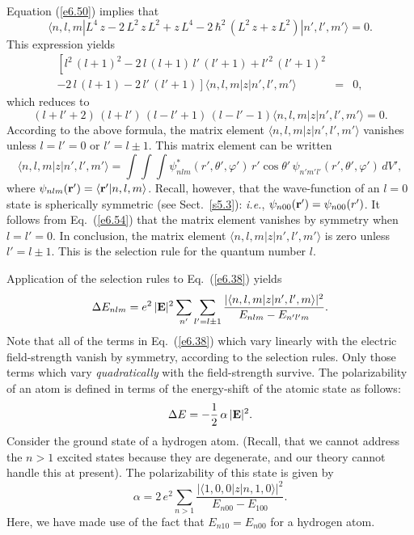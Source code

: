 Equation (\ref{e6.50}) implies that
\begin{equation}
\langle n,l,m| L^4\, z - 2\, L^2\, z \,L^2 + z\, L^4 - 2 \,\hbar^2 \,(L^2\, z +z\, L^2) |n',l',m'
\rangle = 0.
\end{equation}
This expression yields
\begin{eqnarray}
\left[l^2\, (l+1)^2 - 2\, l\,(l+1)\,l'\,(l'+1) + l'^2\,(l'+1)^2 \right.&&\nonumber\\[0.5ex]
\left.- 2\, l\,(l+1)
- 2\,l'\,(l'+1)\right] \langle n,l,m|z|n',l',m' \rangle& =& 0,
\end{eqnarray}
which reduces to
\begin{equation}
(l+l'+2)\,(l+l')\,(l-l'+1)\,(l-l'-1)\langle n,l,m|z| n',l',m' \rangle = 0.
\end{equation}
According to the above formula, the matrix element 
$\langle n,l,m|z| n',l',m' \rangle$
vanishes unless $l=l'=0$ or $l' = l\pm 1$. This matrix element can be written
\begin{equation}\label{e6.54}
\langle n,l,m|z| n',l',m' \rangle = \int\!\int\!\int
 \psi^\ast_{nlm}(r',\theta',\varphi')\,
r'\cos\theta'\, \psi_{n'm'l'}(r',\theta',\varphi') \,dV',
\end{equation}
where $\psi_{nlm}({\bf r}') = \langle {\bf r}'|n,l,m\rangle$. Recall, however,
that the wave-function of an $l=0$ state is spherically symmetric (see Sect.~\ref{s5.3}):
{\em i.e.}, $\psi_{n00}({\bf r}') = \psi_{n00}(r')$. It follows from Eq.~(\ref{e6.54})
that the matrix element
vanishes by symmetry when $l=l'=0$. In conclusion, the matrix element
$\langle n,l,m|z| n',l',m' \rangle$ is zero unless $l'=l\pm 1$. This is
 the selection rule for the quantum number $l$. 

Application of the selection rules to Eq.~(\ref{e6.38}) yields
\begin{equation}
\Delta E_{nlm} = e^2 \,|{\bf E}|^2 \sum_{n'}\sum_{l'=l\pm 1}
\frac{|\langle n,l,m|z|n',l',m\rangle|^2}{E_{nlm} - E_{n'l' m}}.
\end{equation}
Note that all of the terms in Eq.~(\ref{e6.38}) which vary linearly with
 the electric field-strength
vanish by symmetry, according to the selection rules.
 Only those terms which vary {\em quadratically} with the
field-strength survive. The polarizability of an atom is defined in terms
of the energy-shift of the atomic state as follows:
\begin{equation}
\Delta E = - \frac{1}{2} \,\alpha \,|{\bf E}|^2.
\end{equation}
Consider the ground state of a hydrogen atom. (Recall, that we cannot address
the $n>1$ excited states because they are degenerate, and our theory cannot
handle this at present). The polarizability of this state is given by
\begin{equation}
\alpha = 2 \,e^2  \sum_{n>1} 
\frac{|\langle 1,0,0|z|n,1,0\rangle|^2}{E_{n00}-E_{100}}.
\end{equation}
Here, we have made use of the fact that $E_{n10} = E_{n00}$ for a hydrogen atom.

